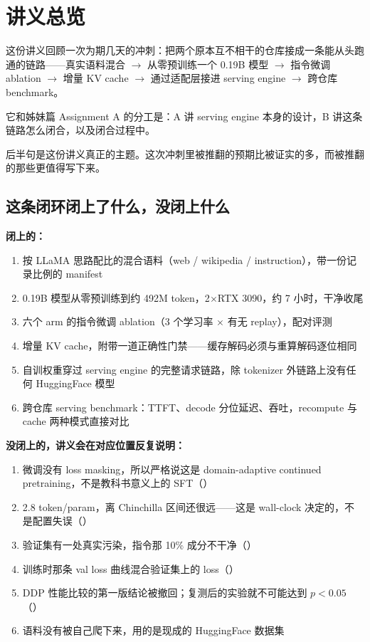 \section{讲义总览}
\label{sec:b-overview}

这份讲义回顾一次为期几天的冲刺：把两个原本互不相干的仓库接成一条能从头跑通的链路——真实语料混合 \(\rightarrow\) 从零预训练一个 0.19B 模型 \(\rightarrow\) 指令微调 ablation \(\rightarrow\) 增量 KV cache \(\rightarrow\) 通过适配层接进 serving engine \(\rightarrow\) 跨仓库 benchmark。

它和姊妹篇 Assignment A 的分工是：A 讲 serving engine 本身的设计，B 讲这条链路怎么闭合，以及闭合过程中。

后半句是这份讲义真正的主题。这次冲刺里被推翻的预期比被证实的多，而被推翻的那些更值得写下来。

\subsection{这条闭环闭上了什么，没闭上什么}
\label{sec:b-scope}

\textbf{闭上的：}

\begin{enumerate}[label=\arabic*., itemsep=2pt]
  \item 按 LLaMA 思路配比的混合语料（web / wikipedia / instruction），带一份记录比例的 manifest
  \item 0.19B 模型从零预训练到约 492M token，2\(\times\)RTX 3090，约 7 小时，干净收尾
  \item 六个 arm 的指令微调 ablation（3 个学习率 \(\times\) 有无 replay），配对评测
  \item 增量 KV cache，附带一道正确性门禁——缓存解码必须与重算解码逐位相同
  \item 自训权重穿过 serving engine 的完整请求链路，除 tokenizer 外链路上没有任何 HuggingFace 模型
  \item 跨仓库 serving benchmark：TTFT、decode 分位延迟、吞吐，recompute 与 cache 两种模式直接对比
\end{enumerate}

\textbf{没闭上的，讲义会在对应位置反复说明：}

\begin{enumerate}[label=\arabic*., itemsep=2pt]
  \item 微调没有 loss masking，所以严格说这是 domain-adaptive continued pretraining，不是教科书意义上的 SFT（）
  \item 2.8 token/param，离 Chinchilla 区间还很远——这是 wall-clock 决定的，不是配置失误（）
  \item 验证集有一处真实污染，指令那 10\% 成分不干净（）
  \item 训练时那条 val loss 曲线混合验证集上的 loss（）
  \item DDP 性能比较的第一版结论被撤回；复测后的实验就不可能达到 \(p<0.05\)（）
  \item 语料没有被自己爬下来，用的是现成的 HuggingFace 数据集
\end{enumerate}

